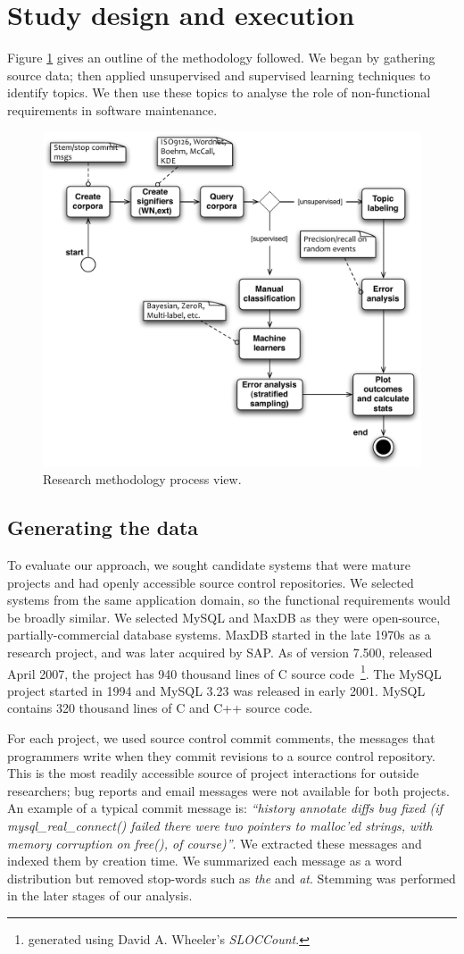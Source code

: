 \documentclass[]{sig-alternate}
\begin{document}
 
\section{Study design and execution}
Figure \ref{fig:process} gives an outline of the methodology followed. We began by gathering source data; then applied unsupervised and supervised learning techniques to identify topics. We then use these topics to analyse the role of non-functional requirements in software maintenance.

\begin{figure}
  \centering
 \includegraphics[width=.45\textwidth]{process-model}
 \caption{Research methodology process view.}
  \label{fig:process}
\end{figure}

\subsection{Generating the data}
\label{sec:wordlist}
To evaluate our approach, we sought candidate systems that were mature projects and had openly accessible source control repositories. We selected systems from the same application domain, so the functional requirements would be broadly similar. We selected MySQL and MaxDB as they were open-source, partially-commercial database systems. MaxDB started in the late 1970s as a research project, and was later acquired by SAP. As of version 7.500, released April 2007, the project has 940 thousand lines of C source code~\footnote{generated using David A. Wheeler's \emph{SLOCCount}.}. The MySQL project started in 1994 and MySQL 3.23 was released in early 2001. MySQL contains 320 thousand lines of C and C++ source code. 

For each project, we used source control commit comments, the messages that programmers write when they commit revisions to a source control repository. This is the most readily accessible source of project interactions for outside researchers; bug reports and email messages were not available for both projects. An example of a typical commit message is: \textit{``history annotate diffs bug fixed (if mysql\_real\_connect() failed there were two pointers to malloc'ed strings, with memory corruption on free(), of course)''}. We extracted these messages and indexed them by creation time. We summarized each message as a word distribution but removed stop-words such as \emph{the} and \emph{at}. Stemming was performed in the later stages of our analysis.
\end{document}
